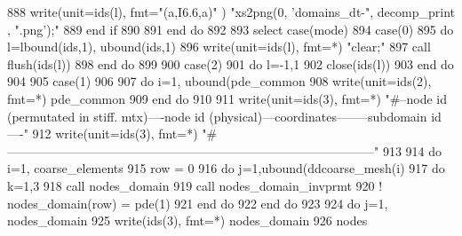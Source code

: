 \begin{DoxyCode}
{{888           \textcolor{keyword}{write}(unit=ids(l), fmt=\textcolor{stringliteral}{"(a,I6.6,a)"} ) \textcolor{stringliteral}{"xs2png(0, 'domains\_dt-"}, decomp\_print\textcolor{comment}{ , }\textcolor{stringliteral}{".png');"}
889 \textcolor{keywordflow}{        end if}
890 
891 \textcolor{keywordflow}{      end do}
892 
893       \textcolor{keywordflow}{select case}(mode)
894         \textcolor{keywordflow}{case}(0)
895           \textcolor{keywordflow}{do} l=lbound(ids,1), ubound(ids,1)
896             \textcolor{keyword}{write}(unit=ids(l), fmt=*) \textcolor{stringliteral}{"clear;"}
897             \textcolor{keyword}{call }flush(ids(l))
898 \textcolor{keywordflow}{          end do}
899 
900         \textcolor{keywordflow}{case}(2)
901           \textcolor{keywordflow}{do} l=-1,1
902             \textcolor{keyword}{close}(ids(l))
903 \textcolor{keywordflow}{          end do}
904 
905         \textcolor{keywordflow}{case}(1)
906 
907           \textcolor{keywordflow}{do} i=1, ubound(pde_common%
908             \textcolor{keyword}{write}(unit=ids(2), fmt=*) pde_common%
909 \textcolor{keywordflow}{          end do}
910 
911           \textcolor{keyword}{write}(unit=ids(3), fmt=*) \textcolor{stringliteral}{"#--node id (permutated in stiff. mtx)----node id
       (physical)---coordinates--------subdomain id----"}
912           \textcolor{keyword}{write}(unit=ids(3), fmt=*) \textcolor{stringliteral}{
      "#-----------------------------------------------------------------------------------------"}
913 
914           \textcolor{keywordflow}{do} i=1, coarse_elements%
915             row = 0
916             \textcolor{keywordflow}{do} j=1,ubound(ddcoarse_mesh(i)%
917               \textcolor{keywordflow}{do} k=1,3
918                 \textcolor{keyword}{call }nodes\_domain%
919 \textcolor{comment}{                }\textcolor{keyword}{call }nodes\_domain\_invprmt%
920 \textcolor{comment}{!                     nodes\_domain(row) = pde(1)%
921 \textcolor{keywordflow}{              end do}
922 \textcolor{keywordflow}{            end do}  
923 
924             \textcolor{keywordflow}{do} j=1, nodes\_domain%
925               \textcolor{keyword}{write}(ids(3), fmt=*)  nodes\_domain%
926 \textcolor{comment}{               nodes%
}}}}
\end{DoxyCode}
